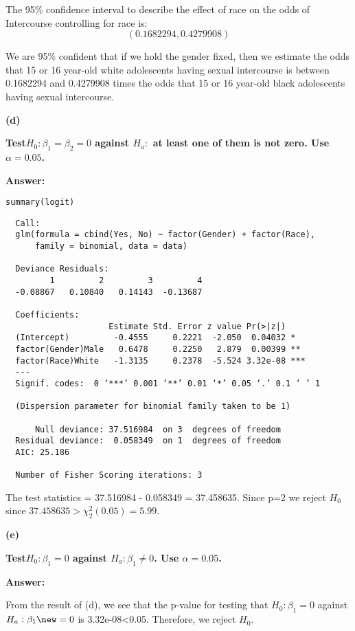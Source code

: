 \documentclass[letterpaper,11pt]{article}
\begin{document}
The 95\% confidence interval to describe the effect of race on the odds of Intercourse controlling for race is:
$$(0.1682294, 0.4279908)$$

We are 95\% confident that if we hold the gender fixed, then we estimate the odds that 15 or 16 year-old white adolescents having sexual intercourse is between 0.1682294 and 0.4279908 times the odds that 15 or 16 year-old black adolescents having sexual intercourse.

\begin{addmargin}[-1.1em]{0em}
  \textbf{(d)}\par
\end{addmargin}
\textbf{Test$H_0:\beta_1 =\beta_2=0$ against $H_a:$ at least one of them is not zero. Use $\alpha = 0.05$.}\par
\bigbreak
\begin{addmargin}[-0.5em]{0em}
  \textbf{Answer: }
\end{addmargin}

\begin{lstlisting}
summary(logit)
\end{lstlisting}

\begin{lstlisting}
  Call:
  glm(formula = cbind(Yes, No) ~ factor(Gender) + factor(Race),
      family = binomial, data = data)

  Deviance Residuals:
         1         2         3         4
  -0.08867   0.10840   0.14143  -0.13687

  Coefficients:
                     Estimate Std. Error z value Pr(>|z|)
  (Intercept)         -0.4555     0.2221  -2.050  0.04032 *
  factor(Gender)Male   0.6478     0.2250   2.879  0.00399 **
  factor(Race)White   -1.3135     0.2378  -5.524 3.32e-08 ***
  ---
  Signif. codes:  0 ‘***’ 0.001 ‘**’ 0.01 ‘*’ 0.05 ‘.’ 0.1 ‘ ’ 1

  (Dispersion parameter for binomial family taken to be 1)

      Null deviance: 37.516984  on 3  degrees of freedom
  Residual deviance:  0.058349  on 1  degrees of freedom
  AIC: 25.186

  Number of Fisher Scoring iterations: 3
\end{lstlisting}

The test statistics = 37.516984 - 0.058349 = 37.458635. Since p=2 we reject $H_0$ since $37.458635>\chi_2^2(0.05) = 5.99$.

\begin{addmargin}[-1.1em]{0em}
  \textbf{(e)}\par
\end{addmargin}
\textbf{Test$H_0: \beta_1 =0$ against $H_a: \beta_1\neq0$. Use $\alpha=0.05$.}\par
\bigbreak
\begin{addmargin}[-0.5em]{0em}
  \textbf{Answer: }
\end{addmargin}
From the result of (d), we see that the p-value for testing that $H_0: \beta_1=0$ against $H_a:\beta_1\new=0$ is 3.32e-08<0.05. Therefore, we reject $H_0$.
\end{document}
